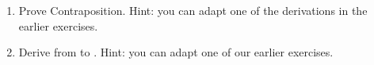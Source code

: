 \begin{enumerate}
{{\begin{argument*}
\end{argument*}
}
}
 \newpage


\item Prove Contraposition. Hint: you can adapt one of the derivations in the 
 earlier exercises.
\opts{
 \dotline

 \dotline

 \dotline

 \dotline

 \dotline

 \dotline

 \dotline

 \dotline

 \dotline

 \dotline

 \dotline

 \dotline

 \dotline

 \dotline

 \dotline

 \dotline

 \dotline

 \dotline

 \dotline
}
{
}

 \newpage
\item Derive from  to . Hint: you can adapt one 
 of our earlier exercises.
\opts{
 \dotline

 \dotline

 \dotline

 \dotline

 \dotline

}
\end{enumerate}
